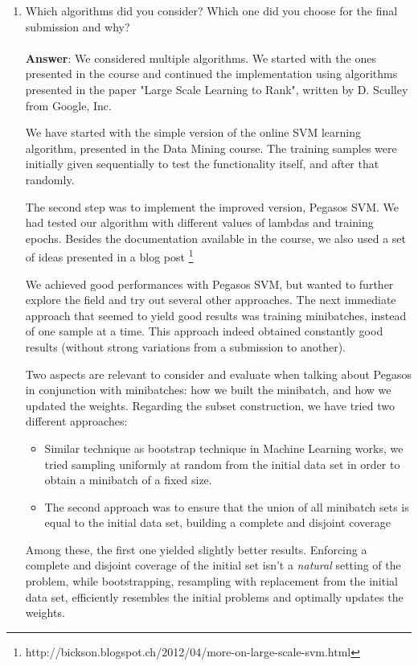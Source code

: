 \documentclass[11pt]{article}
\begin{document}
\begin{enumerate}
\item Which algorithms did you consider? Which one did you choose for the
  final submission and why? \\ \\
\textbf{Answer}: We considered multiple algorithms. We started with the
ones presented in the course and continued the implementation using
algorithms presented in the paper "Large Scale Learning to Rank",
written by D. Sculley from Google, Inc.

We have started with the simple version of the online SVM learning
algorithm, presented in the Data Mining course. The training samples
were initially given sequentially to test the functionality itself, and
after that randomly.

The second step was to implement the improved version, Pegasos SVM. We
had tested our algorithm with different values of lambdas and training
epochs. Besides the documentation available in the course, we also used
a set of ideas presented in a blog post \footnote{
http://bickson.blogspot.ch/2012/04/more-on-large-scale-svm.html}

We achieved good performances with Pegasos SVM, but wanted to further
explore the field and try out several other approaches. The next
immediate approach that seemed to yield good results was training
minibatches, instead of one sample at a time. This approach indeed
obtained constantly good results (without strong variations from a
submission to another).

Two aspects are relevant to consider and evaluate when talking about
Pegasos in conjunction with minibatches: how we built the minibatch, and
how we updated the weights. Regarding the subset construction, we have
tried two different approaches:
\begin{itemize}
\item{Similar technique as bootstrap technique in Machine Learning works,
we tried sampling uniformly at random from the initial data set in order
to obtain a minibatch of a fixed size.}
\item{The second approach was to ensure that the union of all minibatch
sets is equal to the initial data set, building a complete and disjoint
coverage}
\end{itemize}

Among these, the first one yielded slightly better results. Enforcing a
complete and disjoint coverage of the initial set isn't a \emph{natural}
setting of the problem, while bootstrapping, resampling with replacement
from the initial data set, efficiently resembles the initial problems
and optimally updates the weights.


\end{enumerate}
\end{document}
